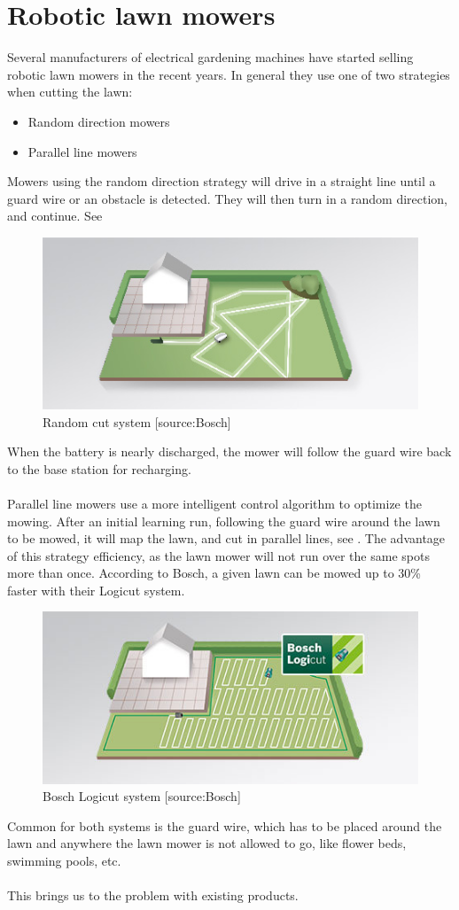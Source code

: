 \section{Robotic lawn mowers}
Several manufacturers of electrical gardening machines have started selling robotic lawn mowers in the recent years. In general they use one of two strategies when cutting the lawn:
\begin{itemize}
	\item Random direction mowers
	\item Parallel line mowers
\end{itemize}

Mowers using the random direction strategy will drive in a straight line until a guard wire or an obstacle is detected. They will then turn in a random direction, and continue. See 

\begin{figure}[H]
\centering
\includegraphics[scale=0.8]{figures/noLogiCut.jpg}
\caption{Random cut system [source:Bosch]} 
\label{fig:randomcut}
\end{figure}
\noindent


When the battery is nearly discharged, the mower will follow the guard wire back to the base station for recharging.\\\\
%
Parallel line mowers use a more intelligent control algorithm to optimize the mowing. After an initial learning run, following the guard wire around the lawn to be mowed, it will map the lawn, and cut in parallel lines, see . The advantage of this strategy efficiency, as the lawn mower will not run over the same spots more than once. According to Bosch, a given lawn can be mowed up to 30\% faster with their Logicut system.
 

\begin{figure}[H]
\centering
\includegraphics[scale=0.8]{figures/logicut.jpg} 
\caption{Bosch Logicut system [source:Bosch]}
\label{fig:logicut}
\end{figure}
\noindent

Common for both systems is the guard wire, which has to be placed around the lawn and anywhere the lawn mower is not allowed to go, like flower beds, swimming pools, etc. \\\\
%
This brings us to the problem with existing products.